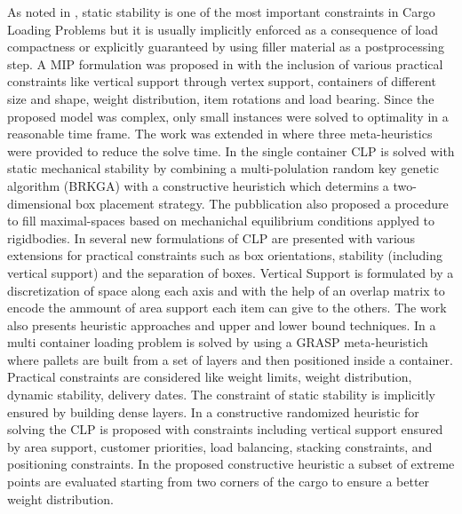 As noted in \cite{BORTFELDT20131}, static stability is one of the most important constraints in Cargo Loading Problems but it is usually implicitly enforced as a consequence of load compactness or explicitly guaranteed by using filler material as a postprocessing step.
A MIP formulation was proposed in \cite{paquay2016mixed} with the inclusion of various practical constraints like vertical support through vertex support, containers of different size and shape, weight distribution, item rotations and load bearing.
Since the proposed model was complex, only small instances were solved to optimality in a reasonable time frame. The work was extended in \cite{paquay2007} where three meta-heuristics were provided to reduce the solve time.
In \cite{GALRAORAMOS2016565} the single container CLP is solved with static mechanical stability by combining a multi-polulation random key genetic algorithm (BRKGA) with a constructive heuristich which determins a two-dimensional box placement strategy.
The pubblication also proposed a procedure to fill maximal-spaces based on mechanichal equilibrium conditions applyed to rigidbodies.
In \cite{kurpel2020exact} several new formulations of CLP are presented with various extensions for practical constraints such as box orientations, stability (including vertical support) and the separation of boxes.
Vertical Support is formulated by a discretization of space along each axis and with the help of an overlap matrix to encode the ammount of area support each item can give to the others.
The work also presents heuristic approaches and upper and lower bound techniques.
In \cite{Alonso2020} a multi container loading problem is solved by using a GRASP meta-heuristich where pallets are built from a set of layers and then positioned inside a container. 
Practical constraints are considered like weight limits, weight distribution, dynamic stability, delivery dates. The constraint of static stability is implicitly ensured by building dense layers.
In \cite{GAJDA2022102559} a constructive randomized heuristic for solving the CLP is proposed with constraints including vertical support ensured by area support, customer priorities, load balancing, stacking constraints, and positioning constraints.
In the proposed constructive heuristic a subset of extreme points are evaluated starting from two corners of the cargo to ensure a better weight distribution.

